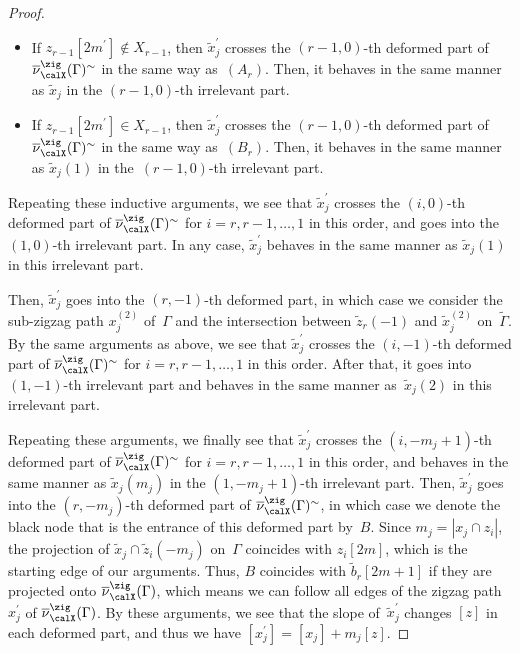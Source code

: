 \begin{proof}
\begin{itemize}
\begin{itemize}
\item If $z_{r-1}[2m^\prime]\not\in X_{r-1}$, then $\widetilde{x}_j^\prime$ crosses the $(r-1,0)$-th deformed part of $\overline{\nu}_\calX^\zig(\Gamma)^\sim$ in the same way as~$(A_r)$.
Then, it behaves in the same manner as $\widetilde{x}_j$ in the $(r-1,0)$-th irrelevant part.
\item If $z_{r-1}[2m^\prime]\in X_{r-1}$, then $\widetilde{x}_j^\prime$ crosses the $(r-1,0)$-th deformed part of $\overline{\nu}_\calX^\zig(\Gamma)^\sim$ in the same way as~$(B_r)$.
Then, it behaves in the same manner as $\widetilde{x}_j(1)$ in the~$(r-1,0)$-th irrelevant part.
\end{itemize}
\end{itemize}
Repeating these inductive arguments, we see that $\widetilde{x}^\prime_j$ crosses the $(i,0)$-th deformed part of $\overline{\nu}_\calX^\zig(\Gamma)^\sim$ for $i=r,r-1,\dots,1$ in this order, and goes into the $(1,0)$-th irrelevant part.
In any case, $\widetilde{x}^\prime_j$ behaves in the same manner as $\widetilde{x}_j(1)$ in this irrelevant part.

Then, $\widetilde{x}^\prime_j$ goes into the $(r,-1)$-th deformed part, in which case we consider the sub-zigzag path $x_j^{(2)}$ of~$\Gamma$
and the intersection between $\widetilde{z}_r(-1)$ and $\widetilde{x}_j^{(2)}$ on~$\widetilde{\Gamma}$.
By the same arguments as above, we see that $\widetilde{x}^\prime_j$ crosses the $(i,-1)$-th deformed part of $\overline{\nu}_\calX^\zig(\Gamma)^\sim$ for $i=r,r-1,\dots,1$ in this order.
After that, it goes into $(1,-1)$-th irrelevant part and behaves in the same manner as~$\widetilde{x}_j(2)$ in this irrelevant part.

Repeating these arguments, we finally see that $\widetilde{x}^\prime_j$ crosses the $(i,-m_j+1)$-th deformed part of $\overline{\nu}_\calX^\zig(\Gamma)^\sim$ for $i=r,r-1,\dots,1$ in this order,
and behaves in the same manner as $\widetilde{x}_j(m_j)$ in the $(1,-m_j+1)$-th irrelevant part.
Then, $\widetilde{x}^\prime_j$ goes into the $(r,-m_j)$-th deformed part of $\overline{\nu}_\calX^\zig(\Gamma)^\sim$, in which case
we denote the black node that is the entrance of this deformed part by~$B$.
Since $m_j=|x_j\cap z_i|$, the projection of $\widetilde{x}_j\cap \widetilde{z}_i(-m_j)$ on~$\Gamma$ coincides with $z_i[2m]$, which is the starting edge of our arguments.
Thus, $B$ coincides with $\widetilde{b}_r[2m+1]$ if they are projected onto $\overline{\nu}_\calX^\zig(\Gamma)$,
which means we can follow all edges of the zigzag path $x^\prime_j$ of $\overline{\nu}_\calX^\zig(\Gamma)$.
By these arguments, we see that the slope of~$\widetilde{x}^\prime_j$ changes $[z]$ in each deformed part, and thus we have $[x^{\prime}_j]=[x_j]+m_j[z]$.


\end{proof}
